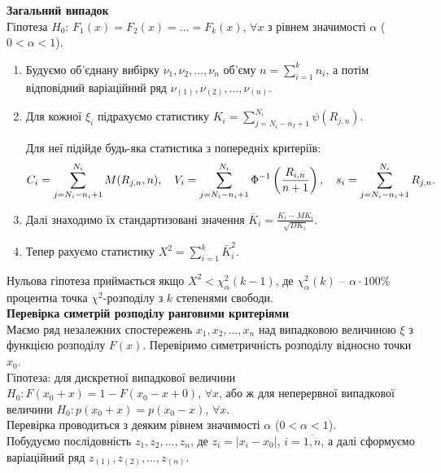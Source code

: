 \textbf{Загальний випадок} \\

Гіпотеза $H_0$: $F_1(x) = F_2(x) = \ldots = F_k(x)$, $\forall x$ з рівнем значимості $\alpha$ ($0 < \alpha < 1$). 

\begin{enumerate}
    \item Будуємо об'єднану вибірку $\nu_1, \nu_2, \ldots, \nu_n$ об'єму $n = \sum_{i=1}^k n_i$, а потім відповідний варіаційний ряд $\nu_{(1)}, \nu_{(2)}, \ldots, \nu_{(n)}$.
    
    \item Для кожної $\xi_i$ підрахуємо статистику $K_i = \sum_{j = N_i - n_I + 1}^{N_i} \psi(R_{j, n})$. 
    
    Для неї підійде будь-яка статистика з попередніх критеріїв:
    \[ C_i = \displaystyle\sum\limits_{j = N_i - n_i + 1}^{N_i} M(R_{j, n}, n), \quad V_i = \displaystyle\sum\limits_{j = N_i - n_i + 1}^{N_i} \Phi^{-1} \left( \dfrac{R_{i,n}}{n+1} \right), \quad s_i = \displaystyle\sum\limits_{j = N_i - n_i + 1}^{N_i} R_{j, n}. \]
    
    \item Далі знаходимо їх стандартизовані значення $\bar{K}_i = \frac{K_i - MK_i}{\sqrt{DK_i}}$.
    
    \item Тепер рахуємо статистику $X^2 = \sum_{i=1}^k \bar{K}_i^2$. 
\end{enumerate}

Нульова гіпотеза приймається якщо $X^2 < \chi_\alpha^2(k-1)$, де $\chi_\alpha^2(k)$ -- $\alpha \cdot 100\%$ процентна точка $\chi^2$-розподілу з $k$ степенями свободи. \\

\textbf{Перевірка симетрій розподілу ранговими критеріями} \\

Маємо ряд незалежних спостережень $x_1, x_2, \ldots, x_n$ над випадковою величиною $\xi$ з функцією розподілу $F(x)$. Перевіримо симетричність розподілу відносно точки $x_0$. \\

Гіпотеза: для дискретної випадкової величини $H_0: F(x_0 + x) = 1 - F(x_0 - x + 0)$, $\forall x$, або ж для неперервної випадкової величини $H_0: p(x_0 + x) = p(x_0 - x)$, $\forall x$. \\

Перевірка проводиться з деяким рівнем значимості $\alpha$ ($0 < \alpha < 1$). \\

Побудуємо послідовність $z_1, z_2, \ldots, z_n$, де $z_i = |x_i - x_0|$, $i = \overline{1, n}$, а далі сформуємо варіаційний ряд $z_{(1)}, z_{(2)}, \ldots, z_{(n)}$. \\

